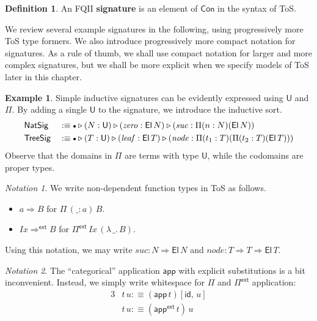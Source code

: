 \documentclass[12pt,a4paper,twoside,openany]{book}
\theoremstyle{remark}
\newtheorem{notation}{Notation}
\theoremstyle{definition}
\newtheorem{mydefinition}{Definition}
\newtheorem{myexample}{Example}
\theoremstyle{theorem}
\newcommand{\mi}[1]{\mathit{#1}}
\newcommand{\ms}[1]{\mathsf{#1}}
\newcommand{\id}{\mathsf{id}}
\newcommand{\Con}{\mathsf{Con}}
\newcommand{\U}{\mathsf{U}}
\newcommand{\El}{\mathsf{El}}
\newcommand{\ext}{\triangleright}
\newcommand{\emptycon}{\scaleobj{.75}\bullet}
\newcommand{\Pii}{\Pi}
\newcommand{\funi}{\Rightarrow}
\newcommand{\fune}{\Rightarrow^{\ms{ext}}}
\newcommand{\appi}{\mathsf{app}}
\newcommand{\Pie}{\Pi^{\mathsf{ext}}}
\newcommand{\appe}{\mathsf{app^{ext}}}
\newcommand{\app}{\ms{app}}
\newcommand{\defn}{:\equiv}
\begin{document}
\begin{mydefinition} An FQII \textbf{signature} is an element of $\Con$ in the syntax of ToS.
\end{mydefinition}
We review several example signatures in the following, using progressively
more ToS type formers.  We also introduce progressively more compact notation
for signatures. As a rule of thumb, we shall use compact notation for larger and
more complex signatures, but we shall be more explicit when we specify models of
ToS later in this chapter.
\begin{myexample}
  Simple inductive signatures can be evidently expressed using $\U$ and
  $\Pi$. By adding a single $\U$ to the signature, we introduce the inductive
  sort.
  \begin{alignat*}{3}
    & \ms{NatSig} &&\defn \emptycon \ext (N : \U) \ext (\mi{zero} : \El\,N)
                        \ext (\mi{suc} : \Pi (n : N) (\El\,N))\\
    & \ms{TreeSig} &&\defn \emptycon \ext (T : \U) \ext (\mi{leaf} : \El\,T)
                         \ext (\mi{node} : \Pi (t_1 : T) (\Pi (t_2 : T) (\El\,T)))
  \end{alignat*}
  Observe that the domains in $\Pi$ are terms with type $\U$, while the codomains are proper types.
\end{myexample}

\begin{notation} We write non-dependent function types in ToS as follows.
  \begin{itemize}
  \item $a \funi B$ for $\Pi\,(\_ : a)\,B$.
  \item $\mi{Ix} \fune B$ for $\Pie\,\mi{Ix}\,(\lambda\,\_.\,B)$.
  \end{itemize}
\end{notation}
\noindent
Using this notation, we may write $\mi{suc} : N \funi \El\,N$ and $\mi{node} : T
\funi T \funi \El\,T$.

\begin{notation}
The ``categorical'' application $\app$ with explicit substitutions is a bit
inconvenient. Instead, we simply write whitespace for $\Pii$ and $\Pie$
application:
\begin{alignat*}{3}
  & t\,u \defn (\appi\,t)[\id,\,u]\\
  & t\,u \defn (\appe\,t)\,u
\end{alignat*}
\end{notation}
\end{document}
